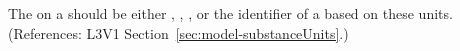 The  on a \Model should be either ,
 , ,
 or the identifier of a \UnitDefinition based
on these units.  (References: L3V1 Section~\ref{sec:model-substanceUnits}.)
